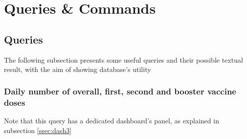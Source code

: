 \documentclass{article}[IEEEtran]
\begin{document}
\newpage

\section{Queries \& Commands}\label{cmd-que}

\subsection{Queries}

The following subsection presents some useful queries and their possible textual result, with the aim of showing database's utility

\subsubsection{Daily number of overall, first, second and booster vaccine doses}\label{ssec:q1}

Note that this query has a dedicated dashboard's panel, as explained in subsection \ref{ssec:dash3}
\end{document}

